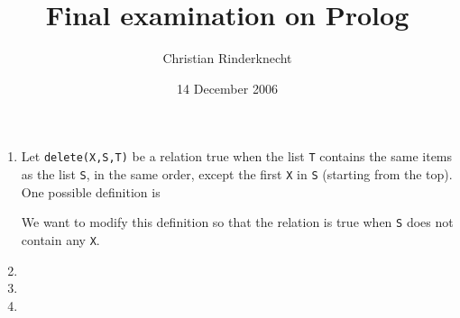 \documentclass[11pt,a4paper]{article}
\title{Final examination on Prolog}
\author{Christian Rinderknecht}
\date{14 December 2006}
\begin{document}
\maketitle
\thispagestyle{empty}

\begin{enumerate}

  \item Let \texttt{delete(X,S,T)} be a relation true when the list
    \texttt{T} contains the same items as the list \texttt{S}, in the
    same order, except the first \texttt{X} in \texttt{S} (starting
    from the top). One possible definition is
    {\small}

    \noindent We want to modify this definition so that the relation
    is true when \texttt{S} does not contain any \texttt{X}.

    

  \item
    

  \item
    

  \item
    

\end{enumerate}
\end{document}
